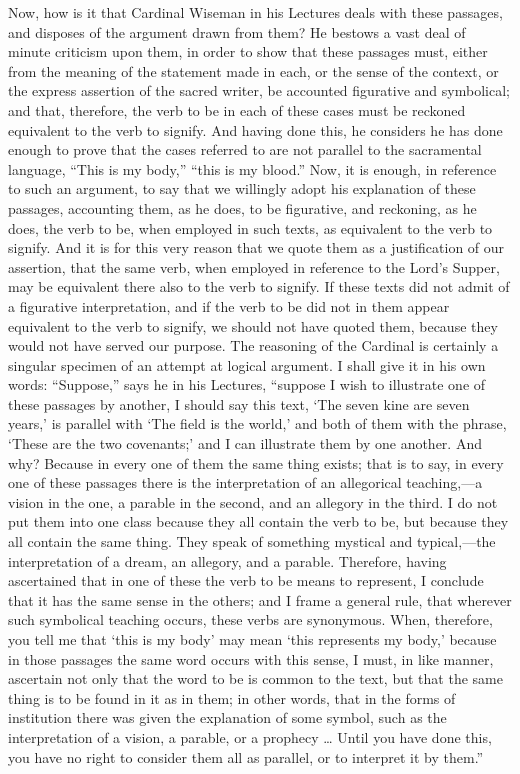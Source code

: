 \documentclass[]{book}
\begin{document}
Now, how is it that Cardinal Wiseman in his Lectures deals with these passages, and disposes of the argument drawn from them? He bestows a vast deal of minute criticism upon them, in order to show that these passages must, either from the meaning of the statement made in each, or the sense of the context, or the express assertion of the sacred writer, be accounted figurative and symbolical; and that, therefore, the verb to be in each of these cases must be reckoned equivalent to the verb to signify. And having done this, he considers he has done enough to prove that the cases referred to are not parallel to the sacramental language, ``This is my body,'' ``this is my blood.'' Now, it is enough, in reference to such an argument, to say that we willingly adopt his explanation of these passages, accounting them, as he does, to be figurative, and reckoning, as he does, the verb to be, when employed in such texts, as equivalent to the verb to signify. And it is for this very reason that we quote them as a justification of our assertion, that the same verb, when employed in reference to the Lord's Supper, may be equivalent there also to the verb to signify. If these texts did not admit of a figurative interpretation, and if the verb to be did not in them appear equivalent to the verb to signify, we should not have quoted them, because they would not have served our purpose. The reasoning of the Cardinal is certainly a singular specimen of an attempt at logical argument. I shall give it in his own words: ``Suppose,'' says he in his Lectures, ``suppose I wish to illustrate one of these passages by another, I should say this text, `The seven kine are seven years,' is parallel with `The field is the world,' and both of them with the phrase, `These are the two covenants;' and I can illustrate them by one another. And why? Because in every one of them the same thing exists; that is to say, in every one of these passages there is the interpretation of an allegorical teaching,---a vision in the one, a parable in the second, and an allegory in the third. I do not put them into one class because they all contain the verb to be, but because they all contain the same thing. They speak of something mystical and typical,---the interpretation of a dream, an allegory, and a parable. Therefore, having ascertained that in one of these the verb to be means to represent, I conclude that it has the same sense in the others; and I frame a general rule, that wherever such symbolical teaching occurs, these verbs are synonymous. When, therefore, you tell me that `this is my body' may mean `this represents my body,' because in those passages the same word occurs with this sense, I must, in like manner, ascertain not only that the word to be is common to the text, but that the same thing is to be found in it as in them; in other words, that in the forms of institution there was given the explanation of some symbol, such as the interpretation of a vision, a parable, or a prophecy \ldots{} Until you have done this, you have no right to consider them all as parallel, or to interpret it by them.''
\end{document}
